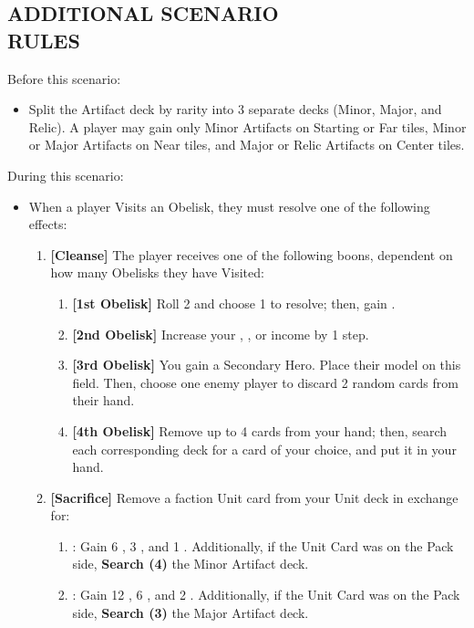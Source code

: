 \begin{multicols*}{2}
\subsection*{\MakeUppercase{Additional Scenario\\Rules}}
Before this scenario:
\begin{itemize}
    \item Split the Artifact deck by rarity into 3 separate decks (Minor, Major, and Relic). A player may gain only Minor Artifacts on Starting or Far tiles, Minor or Major Artifacts on Near tiles, and Major or Relic Artifacts on Center tiles.
\end{itemize}
During this scenario:
\begin{itemize}
    \item When a player Visits an Obelisk, they must resolve one of the following effects:
    \begin{enumerate}[leftmargin=15pt]
        \item \textbf{[Cleanse]} The player receives one of the following boons, dependent on how many Obelisks they have Visited:
        \begin{enumerate}
            \item \textbf{[1st Obelisk]} Roll 2  and choose 1 to resolve; then, gain .
            \item \textbf{[2nd Obelisk]} Increase your , , or  income by 1 step.
            \item \textbf{[3rd Obelisk]} You gain a Secondary Hero. Place their model on this field. Then, choose one enemy player to discard 2 random cards from their hand.
            \item \textbf{[4th Obelisk]} Remove up to 4 cards from your hand; then, search each corresponding deck for a card of your choice, and put it in your hand.
        \end{enumerate}
        \item \textbf{[Sacrifice]} Remove a faction Unit card from your Unit deck in exchange for:
        \begin{enumerate}
            \item {}: Gain 6 , 3 , and 1 . Additionally, if the Unit Card was on the Pack side, \textbf{Search (4)} the Minor Artifact deck.
            \item {}: Gain 12 , 6 , and 2 . Additionally, if the Unit Card was on the Pack side, \textbf{Search (3)} the Major Artifact deck.

\end{enumerate}
\end{enumerate}
\end{itemize}
\end{multicols*}
